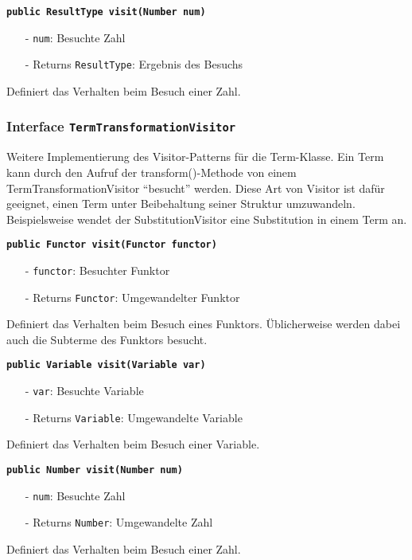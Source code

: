 \documentclass[parskip=full,11pt,twoside]{scrartcl}
\begin{document}
\textbf{\texttt{public ResultType visit(Number num)}}
\begin{itemize}[noitemsep]
	\item[-] \texttt{num}: Besuchte Zahl
	\item[-] Returns \texttt{ResultType}: Ergebnis des Besuchs
\end{itemize}
Definiert das Verhalten beim Besuch einer Zahl.

\subsubsection{Interface \texttt{TermTransformationVisitor}}
Weitere Implementierung des Visitor-Patterns für die Term-Klasse. Ein Term kann durch den Aufruf der transform()-Methode von einem TermTransformationVisitor \enquote{besucht} werden. Diese Art von Visitor ist dafür geeignet, einen Term unter Beibehaltung seiner Struktur umzuwandeln. Beispielsweise wendet der SubstitutionVisitor eine Substitution in einem Term an.

\textbf{\texttt{public Functor visit(Functor functor)}}
\begin{itemize}[noitemsep]
	\item[-] \texttt{functor}: Besuchter Funktor
	\item[-] Returns \texttt{Functor}: Umgewandelter Funktor
\end{itemize}
Definiert das Verhalten beim Besuch eines Funktors. Üblicherweise werden dabei auch die Subterme des Funktors besucht.

\textbf{\texttt{public Variable visit(Variable var)}}
\begin{itemize}[noitemsep]
	\item[-] \texttt{var}: Besuchte Variable
	\item[-] Returns \texttt{Variable}: Umgewandelte Variable
\end{itemize}
Definiert das Verhalten beim Besuch einer Variable.

\textbf{\texttt{public Number visit(Number num)}}
\begin{itemize}[noitemsep]
	\item[-] \texttt{num}: Besuchte Zahl
	\item[-] Returns \texttt{Number}: Umgewandelte Zahl
\end{itemize}
Definiert das Verhalten beim Besuch einer Zahl.

\end{document}
